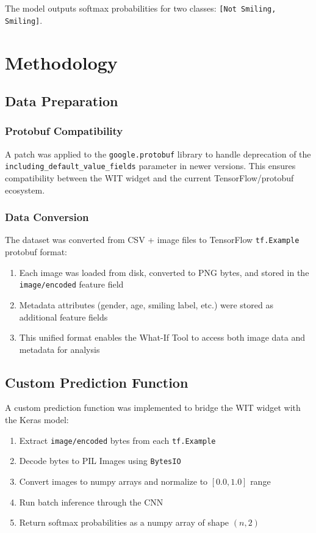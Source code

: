 \documentclass[12pt,a4paper]{article}
\begin{document}
The model outputs softmax probabilities for two classes: \texttt{[Not Smiling, Smiling]}.

\section{Methodology}

\subsection{Data Preparation}

\subsubsection{Protobuf Compatibility}
A patch was applied to the \texttt{google.protobuf} library to handle deprecation of the \texttt{including\_default\_value\_fields} parameter in newer versions. This ensures compatibility between the WIT widget and the current TensorFlow/protobuf ecosystem.

\subsubsection{Data Conversion}
The dataset was converted from CSV + image files to TensorFlow \texttt{tf.Example} protobuf format:
\begin{enumerate}
    \item Each image was loaded from disk, converted to PNG bytes, and stored in the \texttt{image/encoded} feature field
    \item Metadata attributes (gender, age, smiling label, etc.) were stored as additional feature fields
    \item This unified format enables the What-If Tool to access both image data and metadata for analysis
\end{enumerate}

\subsection{Custom Prediction Function}
A custom prediction function was implemented to bridge the WIT widget with the Keras model:
\begin{enumerate}
    \item Extract \texttt{image/encoded} bytes from each \texttt{tf.Example}
    \item Decode bytes to PIL Images using \texttt{BytesIO}
    \item Convert images to numpy arrays and normalize to $[0.0, 1.0]$ range
    \item Run batch inference through the CNN
    \item Return softmax probabilities as a numpy array of shape $(n, 2)$
\end{enumerate}
\end{document}
